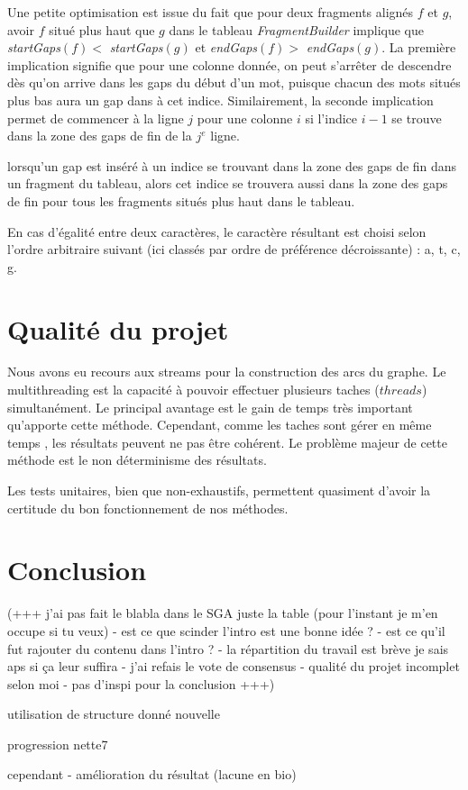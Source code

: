 \documentclass{article}
\begin{document}
Une petite optimisation est issue du fait que pour deux fragments alignés $f$ et $g$, avoir $f$ situé plus haut que $g$ dans le tableau \textit{FragmentBuilder} implique que \textit{startGaps}$(f) < $  \textit{startGaps}$(g)$ et \textit{endGaps}$(f) > $  \textit{endGaps}$(g)$. La première implication signifie que pour une colonne donnée, on peut s'arrêter de descendre dès qu'on arrive dans les gaps du début d'un mot, puisque chacun des mots situés plus bas aura un gap dans à cet indice. Similairement, la seconde implication permet de commencer à la ligne $j$ pour une colonne $i$ si l'indice $i-1$ se trouve dans la zone des gaps de fin de la $j^e$ ligne. 

 lorsqu'un gap est inséré à un indice se trouvant dans la zone des gaps de fin dans un fragment du tableau, alors cet indice se trouvera aussi dans la zone des gaps de fin pour tous les fragments situés plus haut dans le tableau. 

En cas d'égalité entre deux caractères, le caractère résultant est choisi selon l'ordre arbitraire suivant (ici classés par ordre de préférence décroissante) : a, t, c, g.

\section{Qualité du projet}

Nous avons eu recours aux streams pour la construction des arcs du graphe. Le multithreading est la capacité à pouvoir effectuer plusieurs taches ($threads$) simultanément. Le principal avantage est le gain de temps très important qu'apporte cette méthode. Cependant, comme les taches sont gérer en même temps , les résultats peuvent ne pas être cohérent. Le problème majeur de cette méthode est le non déterminisme des résultats.

Les tests unitaires, bien que non-exhaustifs, permettent quasiment d'avoir la certitude du bon fonctionnement de nos méthodes.



\section{Conclusion}

(+++ j'ai pas fait le blabla dans le SGA juste la table (pour l'instant je m'en occupe si tu veux)  - est ce que scinder l'intro est une bonne idée ? - est ce qu'il fut rajouter du contenu dans l'intro ? -  la répartition du travail est brève je sais aps si ça leur suffira -  j'ai refais le vote de consensus -  qualité du projet incomplet selon moi - pas d'inspi pour la conclusion +++)

utilisation de structure donné nouvelle

progression nette7

cependant - amélioration du résultat (lacune en bio)
\end{document}
